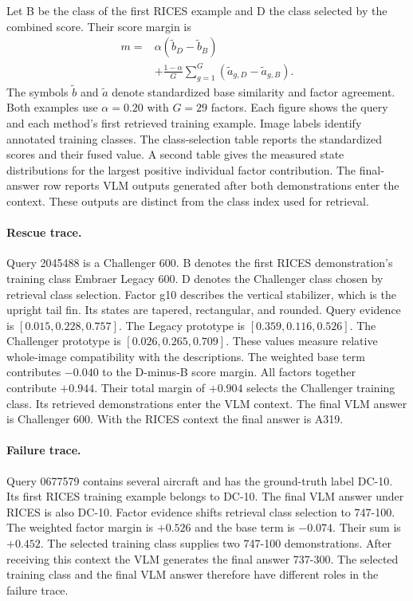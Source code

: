 \documentclass[10pt,twocolumn,letterpaper]{article}
\begin{document}
Let B be the class of the first RICES example and D the class selected by the combined score. Their score margin is
\begin{equation}
\begin{split}
m={}&\alpha(\widetilde b_D-\widetilde b_B)\\
&+\frac{1-\alpha}{G}\sum_{g=1}^{G}(\widetilde a_{g,D}-\widetilde a_{g,B}).
\end{split}
\end{equation}
The symbols $\widetilde b$ and $\widetilde a$ denote standardized base similarity and factor agreement. Both examples use $\alpha=0.20$ with $G=29$ factors. Each figure shows the query and each method's first retrieved training example. Image labels identify annotated training classes. The class-selection table reports the standardized scores and their fused value. A second table gives the measured state distributions for the largest positive individual factor contribution. The final-answer row reports VLM outputs generated after both demonstrations enter the context. These outputs are distinct from the class index used for retrieval.

\paragraph{Rescue trace.}
Query 2045488 is a Challenger 600. B denotes the first RICES demonstration's training class Embraer Legacy 600. D denotes the Challenger class chosen by retrieval class selection. Factor g10 describes the vertical stabilizer, which is the upright tail fin. Its states are tapered, rectangular, and rounded. Query evidence is $[0.015,0.228,0.757]$. The Legacy prototype is $[0.359,0.116,0.526]$. The Challenger prototype is $[0.026,0.265,0.709]$. These values measure relative whole-image compatibility with the descriptions. The weighted base term contributes $-0.040$ to the D-minus-B score margin. All factors together contribute $+0.944$. Their total margin of $+0.904$ selects the Challenger training class. Its retrieved demonstrations enter the VLM context. The final VLM answer is Challenger 600. With the RICES context the final answer is A319.

\paragraph{Failure trace.}
Query 0677579 contains several aircraft and has the ground-truth label DC-10. Its first RICES training example belongs to DC-10. The final VLM answer under RICES is also DC-10. Factor evidence shifts retrieval class selection to 747-100. The weighted factor margin is $+0.526$ and the base term is $-0.074$. Their sum is $+0.452$. The selected training class supplies two 747-100 demonstrations. After receiving this context the VLM generates the final answer 737-300. The selected training class and the final VLM answer therefore have different roles in the failure trace.
\end{document}
